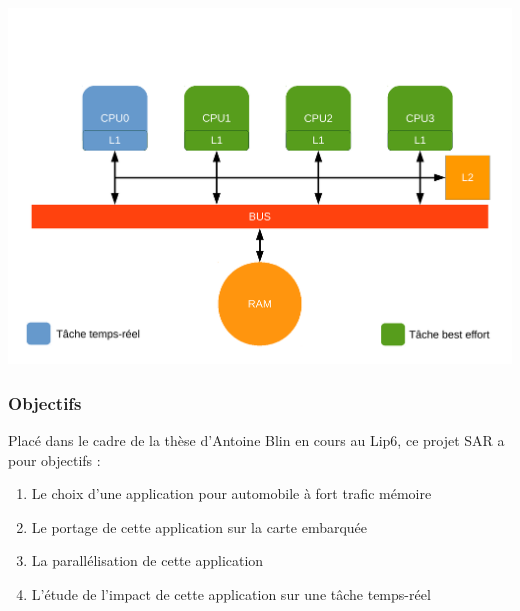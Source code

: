 \begin{frame}
{{\begin{center}
        \includegraphics[trim=0 0 0 130,clip,scale=0.2]{include/archi2.pdf}
      \end{center}
    }
  }
\end{frame}

\begin{frame}
  \frametitle{Objectifs}
  Placé dans le cadre de la thèse d'Antoine Blin en cours au Lip6, ce projet SAR
  a pour objectifs :
  \vspace{1em}
  \begin{enumerate}
  \item Le choix d'une application pour automobile à fort trafic mémoire
    \vspace{1em}
  \item Le portage de cette application sur la carte embarquée
    \vspace{1em}
  \item La parallélisation de cette application
    \vspace{1em}
  \item L'étude de l'impact de cette application sur une tâche temps-réel
  \end{enumerate}
\end{frame}

